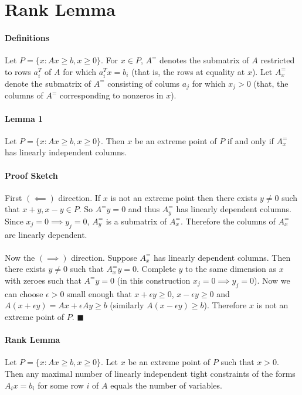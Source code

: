\documentclass[letterpaper,12pt,oneside,onecolumn]{article}
\begin{document}
\section{Rank Lemma}
\paragraph{Definitions} Let $P = \{x : Ax \geq b, x \geq 0\}$. For $x \in P$, $A^=$ denotes the submatrix of $A$ restricted to rows $a_i^T$ of $A$ for which $a_i^Tx = b_i$ (that is, the rows at equality at $x$). Let $A^=_x$ denote the submatrix of $A^=$ consisting of colums $a_j$ for which $x_j > 0$ (that, the columns of $A^=$ corresponding to nonzeros in $x$).

\paragraph{Lemma 1} Let $P = \{x : Ax \geq b, x \geq 0\}$. Then $x$ be an extreme point of $P$ if and only if $A_x^=$ has linearly independent columns.
\paragraph{Proof Sketch} First $(\impliedby)$ direction. If $x$ is not an extreme point then there exists $y \neq 0$ such that $x+y, x-y \in P$. So $A^=y = 0$ and thus $A^=_y$ has linearly dependent columns. Since $x_j = 0 \implies y_j=0$, $A_y^=$ is a submatrix of $A_x^=$. Therefore the columns of $A_x^=$ are linearly dependent.
\paragraph{}
Now the $(\implies)$ direction. Suppose $A_x^=$ has linearly dependent columns. Then there exists $y \neq 0$ such that $A_x^=y = 0$. Complete $y$ to the same dimension as $x$ with zeroes such that $A^=y = 0$ (in this construction $x_j = 0 \implies y_j = 0$). Now we can choose $\epsilon > 0$ small enough that $x+\epsilon y \geq 0$, $x - \epsilon y \geq 0$ and $A(x+\epsilon y) = Ax + \epsilon Ay \geq b$ (similarly $A(x -\epsilon y) \geq b$). Therefore $x$ is not an extreme point of $P$. $\blacksquare$
\paragraph{Rank Lemma}
Let $P = \{x : Ax \geq b, x \geq 0\}$. Let $x$ be an extreme point of $P$ such that $x>0$. Then any maximal number of linearly independent tight constraints of the forms $A_ix = b_i$ for some row $i$ of $A$ equals the number of variables.
\end{document}
